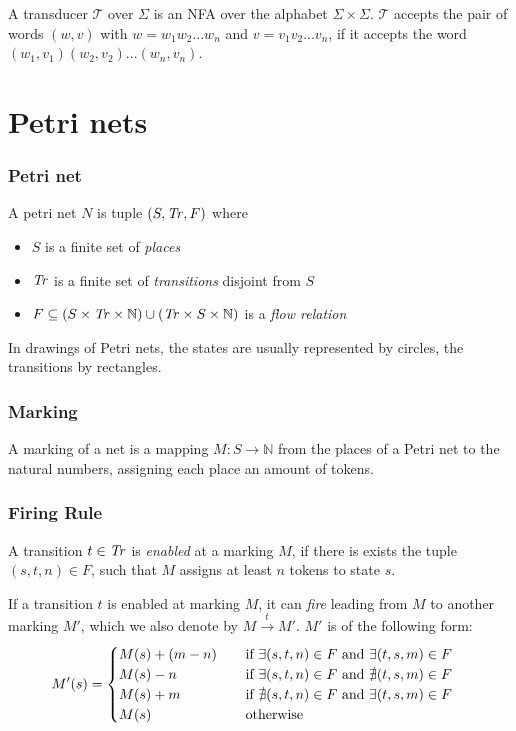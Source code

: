 A transducer $\mathcal{T}$ over $\Sigma$ is an NFA over the alphabet $\Sigma \times \Sigma$. $\mathcal{T}$ accepts the pair of words $(w,v)$ with $w = w_{1}w_{2}...w_{n}$ and $v=v_{1}v_{2}...v_{n}$, if it accepts the word $(w_{1},v_{1})(w_{2},v_{2})...(w_{n},v_{n})$.


\section{Petri nets}

\subsubsection{Petri net}

A petri net $N$ is tuple $(S,\mathit{Tr},F)$ where 
\begin{itemize}[-,noitemsep]
	\item $S$ is a finite set of \emph{places}
	\item $\mathit{Tr}$ is a finite set of \emph{transitions} disjoint from $S$
	\item $F \subseteq (S \times \mathit{Tr} \times \mathbb{N}) \cup (\mathit{Tr} \times S \times \mathbb{N})$ is a \emph{flow relation}
\end{itemize}

In drawings of Petri nets, the states are usually represented by circles, the transitions by rectangles.

\subsubsection{Marking}
A marking of a net is a mapping $M : S \rightarrow \mathbb{N}$ from the places of a Petri net to the natural numbers, assigning each place an amount of tokens.


\subsubsection{Firing Rule}
A transition $t \in \mathit{Tr}$ is \emph{enabled} at a marking $M$, if there is exists the tuple $(s,t,n) \in F$, such that $M$ assigns at least $n$ tokens to state $s$.

If a transition $t$ is enabled at marking $M$, it can \emph{fire} leading from $M$ to another marking $M'$, which we also denote by  $M \xrightarrow{t} M'$. 
$M'$ is of the following form:
\begin{equation*}
M'(s) =  
\begin{cases}
\mathrlap{M(s) + (m - n)}\hphantom{M(s) + (m - n) + 1} \text{ if } \exists (s,t,n) \in F \text{ and } \exists (t,s,m) \in F \\
\mathrlap{M(s) - n}\hphantom{M(s) + (m - n) + 1} \text{ if } \exists (s,t,n) \in F \text{ and } \nexists (t,s,m) \in F \\
\mathrlap{M(s) + m}\hphantom{M(s) + (m - n) + 1} \text{ if }  \nexists (s,t,n) \in F \text{ and } \exists (t,s,m) \in F  \\
\mathrlap{M(s)}\hphantom{M(s) + (m - n) + 1} \text{ otherwise}
\end{cases}
\end{equation*}

